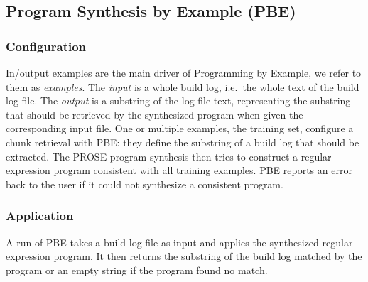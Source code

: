 \subsection{Program Synthesis by Example (PBE)}
\label{sec:expl-pbe}

\subsubsection{Configuration}
In/output examples are the main driver of Programming by Example, we refer to them
as \emph{examples}.
The \emph{input} is a whole build log, i.e.\ the whole text of the build log file.
The \emph{output} is a substring of the log file text, representing the substring that should be retrieved by the synthesized program when given the corresponding input file.
One or multiple examples, the training set, configure a chunk retrieval with PBE:
they define the substring of a build log that should be extracted.
The PROSE program synthesis then tries to construct a regular expression program consistent with all training examples.
PBE reports an error back to the user if it could not synthesize a consistent program.

\subsubsection{Application}
A run of PBE takes a build log file as input and applies the synthesized regular expression program.
It then returns the substring of the build log matched by the program or an empty string if the program found no match.

